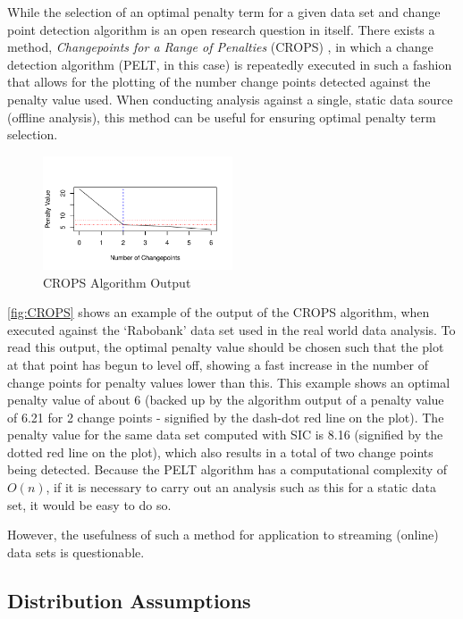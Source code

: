 \documentclass[../main.tex]{subfiles}
\begin{document}
While the selection of an optimal penalty term for a given data set and change point detection algorithm is an open research question in itself. There exists a method, \emph{Changepoints for a Range of Penalties} (CROPS) \cite{Haynes2014}, in which a change detection algorithm (PELT, in this case) is repeatedly executed in such a fashion that allows for the plotting of the number change points detected against the penalty value used. When conducting analysis against a single, static data source (offline analysis), this method can be useful for ensuring optimal penalty term selection.

\begin{figure}[h]
\centering
    \includegraphics[width=0.5\textwidth]{figures/CROPS2}
    \caption{CROPS Algorithm Output}
    \label{fig:CROPS}
\end{figure}

\autoref{fig:CROPS} shows an example of the output of the CROPS algorithm, when executed against the `Rabobank' data set used in the real world data analysis. To read this output, the optimal penalty value should be chosen such that the plot at that point has begun to level off, showing a fast increase in the number of change points for penalty values lower than this. This example shows an optimal penalty value of about 6 (backed up by the algorithm output of a penalty value of 6.21 for 2 change points - signified by the dash-dot red line on the plot). The penalty value for the same data set computed with SIC is 8.16 (signified by the dotted red line on the plot), which also results in a total of two change points being detected. Because the PELT algorithm has a computational complexity of $O(n)$, if it is necessary to carry out an analysis such as this for a static data set, it would be easy to do so.

However, the usefulness of such a method for application to streaming (online) data sets is questionable.


\subsection{Distribution Assumptions}
\end{document}
